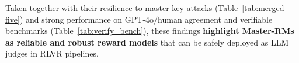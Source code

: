 Taken together with their resilience to master key attacks (Table~\ref{tab:merged-five}) and strong performance on GPT-4o/human agreement and verifiable benchmarks (Table~\ref{tab:verify_bench}), these findings \textbf{highlight Master-RMs as reliable and robust reward models} that can be safely deployed as LLM judges in RLVR pipelines.




